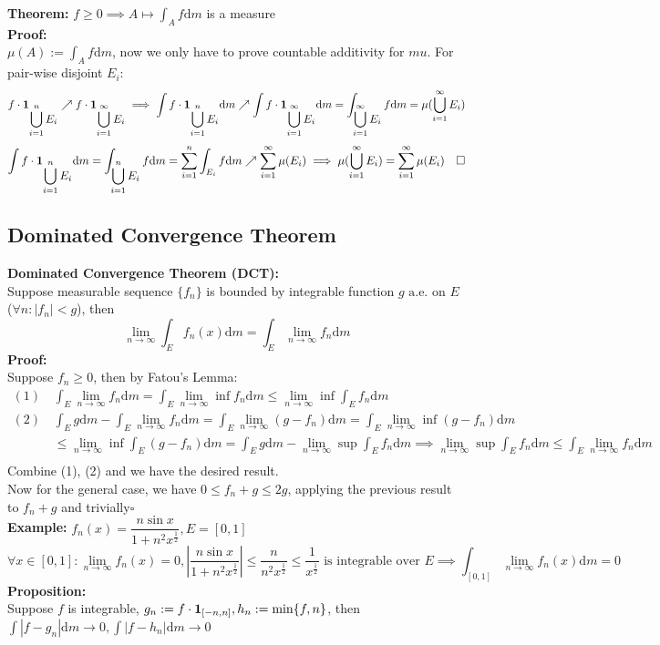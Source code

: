 \documentclass{article}
\newcommand{\sumiinf}{\displaystyle\sum_{i=1}^\infty}
\newcommand{\cupiinf}{\displaystyle\bigcup_{i=1}^\infty}
\newcommand{\sumin}{\displaystyle\sum_{i=1}^n}
\newcommand{\cupin}{\displaystyle\bigcup_{i=1}^n}
\newcommand{\limninf}{\displaystyle\lim_{n\to\infty}}
\newcommand{\0}{{\bf{0}}}
\newcommand{\1}{{\bf{1}}}
\newcommand{\alev}{\mbox{ a.e.}}
\newcommand{\dint}{\displaystyle\int}
\newcommand{\dif}{\mbox{d}}
\newcommand{\incto}{\nearrow}
\begin{document}
\textbf{Theorem:} $f\geq0\implies A\mapsto\dint_Af\dif m$ is a measure\\
\textbf{Proof:}\\
$\mu(A):=\dint_Af\dif m$, now we only have to prove countable additivity for $mu$. For pair-wise disjoint $E_i:$
$$f\cdot\1_{\cupin E_i}\incto f\cdot \1_{\cupiinf E_i}\implies\int f\cdot\1_{\cupin E_i}\dif m\incto\int f\cdot\1_{\cupiinf E_i}\dif m=\dint_{\cupiinf E_i}f\dif m=\mu(\cupiinf E_i)$$
$$\int f\cdot\1_{\cupin E_i}\dif m=\int_{\cupin E_i}f\dif m=\sumin\int_{E_i}f\dif m\incto\sumiinf\mu(E_i)\implies\mu(\cupiinf E_i)=\sumiinf\mu(E_i)\quad\square$$
\subsection{Dominated Convergence Theorem}
\textbf{Dominated Convergence Theorem (DCT):}\\
Suppose measurable sequence $\{f_n\}$ is bounded by integrable function $g\alev$ on $E$ ($\forall n:|f_n|<g$), then
$$\limninf\dint_Ef_n(x)\dif m=\int_E\limninf f_n\dif m$$
\textbf{Proof:}\\
Suppose $f_n\geq0$, then by Fatou's Lemma:
\begin{equation}
\begin{split}
    (1)\,&\int_E\limninf f_n\dif m=\int_E\limninf\inf f_n\dif m\le\limninf\inf\int_Ef_n\dif m\\
    (2)\,&\int_Eg\dif m-\int_E\limninf f_n\dif m=\int_E\limninf(g-f_n)\dif m=\int_E\limninf\inf(g-f_n)\dif m\\
    &\le\limninf\inf\int_E(g-f_n)\dif m=\int_Eg\dif m-\limninf\sup\int_Ef_n\dif m\implies\limninf\sup\int_Ef_n\dif m\le\int_E\limninf f_n\dif m\\
\end{split}
\end{equation}
Combine (1), (2) and we have the desired result.\\
Now for the general case, we have $0\le f_n+g\le 2g$, applying the previous result to $f_n+g$ and trivially\quad$\square$\\
\textbf{Example:} $f_n(x)=\dfrac{n\sin x}{1+n^2x^{\frac{1}{2}}},E=[0,1]$
$$\forall x\in[0,1]:\limninf f_n(x)=0,\left|\frac{n\sin x}{1+n^2x^{\frac{1}{2}}}\right|\le\frac{n}{n^2x^\frac{1}{2}}\le\frac{1}{x^\frac{1}{2}}\mbox{ is integrable over }E\implies\int_{[0,1]}\limninf f_n(x)\dif m=0$$
\textbf{Proposition:}\\
Suppose $f$ is integrable, $g_n:=f\cdot\1_{[-n,n]},h_n:=\min\{f,n\}$, then $\dint|f-g_n|\dif m\to0,\dint|f-h_n|\dif m\to0$\\
\end{document}
